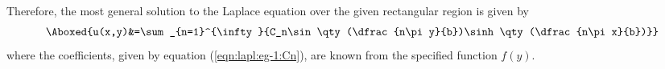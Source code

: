 \begin{enumerate}
            Therefore, the most general solution to the Laplace equation over the given rectangular region is given by
            \begin{align*}
                \Aboxed{u(x,y)&=\sum_{n=1}^{\infty}{C_n\sin\qty(\dfrac{n\pi y}{b})\sinh\qty(\dfrac{n\pi x}{b})}}
            \end{align*}
            where the coefficients, given by equation (\ref{eqn:lapl:eg-1:Cn}), are known from the specified function $f(y)$. 
            
        \end{enumerate}